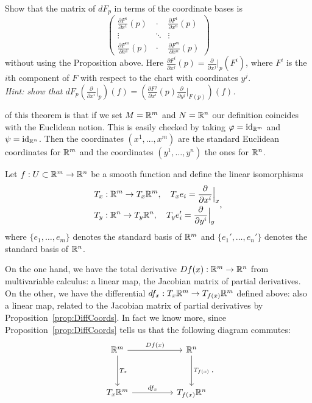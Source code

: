 \begin{exercise}
	Show that the matrix of $d F_p$ in terms of the coordinate bases is
	\begin{equation}
		\begin{pmatrix}
			\frac{\partial F^1}{\partial x^1} (p) & \cdot  & \frac{\partial F^1}{\partial x^n} (p) \\
			\vdots                                & \ddots & \vdots                                \\
			\frac{\partial F^m}{\partial x^1} (p) & \cdot  & \frac{\partial F^m}{\partial x^n} (p)
		\end{pmatrix}
	\end{equation}
	without using the Proposition above. Here $\frac{\partial F^i}{\partial x^j} (p) = \frac{\partial}{\partial x^j}\big|_p (F^i)$, where $F^i$ is the $i$th component of $F$ with respect to the chart with coordinates $y^j$.\\
	\textit{\small Hint: show that $d F_p \left(\frac{\partial}{\partial x^i}\big|_p\right) (f) = \left(\frac{\partial F^j}{\partial x^i} (p) \frac{\partial}{\partial y^j}\big|_{F(p)}\right) (f)$.}
\end{exercise}

 of this theorem is that if we set $M=\mathbb{R}^m$ and $N=\mathbb{R}^n$ our definition coincides with the Euclidean notion.
This is easily checked by taking $\varphi = \operatorname{id}_{\mathbb{R}^m}$ and $\psi=\operatorname{id}_{\mathbb{R}^n}$.
Then the coordinates $(x^1,\ldots,x^m)$ are the standard Euclidean coordinates for $\mathbb{R}^m$ and the coordinates $(y^1,\ldots,y^n)$ the ones for $\mathbb{R}^n$.

Let $f:U\subset\mathbb{R}^m\to\mathbb{R}^n$ be a smooth function and define the linear isomorphisms
\begin{equation}\label{def:lin_iso_Tp}
	\begin{split}
		 & T_x : \mathbb{R}^m \to T_x\mathbb{R}^m,\quad T_x e_i = \frac{\partial}{\partial x^i}\Big|_x  \\
		 & T_y : \mathbb{R}^n \to T_y\mathbb{R}^n,\quad T_y e_i' = \frac{\partial}{\partial y^i}\Big|_y
	\end{split},
\end{equation}
where $\{e_1,\ldots,e_m\}$ denotes the standard basis of $\mathbb{R}^m$ and $\{e_1',\ldots,e_n'\}$ denotes the standard basis of $\mathbb{R}^n$.

On the one hand, we have the total derivative $Df(x):\mathbb{R}^m\to\mathbb{R}^n$ from multivariable calculus: a linear map, the Jacobian matrix of partial derivatives.
On the other, we have the differential $df_x : T_x \mathbb{R}^m \to T_{f(x)}\mathbb{R}^m$ defined above: also a linear map, related to the Jacobian matrix of partial derivatives by Proposition~\ref{prop:DiffCoords}.
In fact we know more, since Proposition~\ref{prop:DiffCoords} tells us that the following diagram commutes:
\begin{equation}
	\begin{tikzcd}[row sep=huge, column sep=huge]
		\R^m \arrow[r, "Df(x)"] \arrow[d, "T_x"]
		& \R^n \arrow[d, "T_{f(x)}"] \\
		T_x\R^m \arrow[r, "df_x"]
		& T_{f(x)}\R^n
	\end{tikzcd}.
\end{equation}

